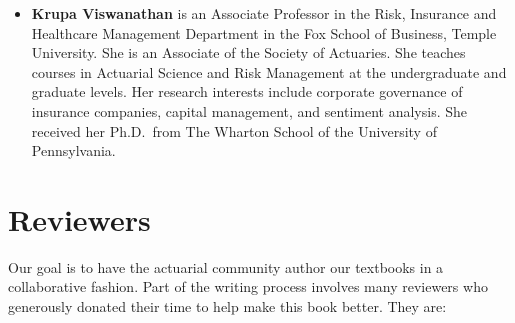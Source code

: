 \documentclass[
]{book}
\providecommand{\tightlist}{%
  \setlength{\itemsep}{0pt}\setlength{\parskip}{0pt}}
\begin{document}
\begin{itemize}
\tightlist
\item
  \textbf{Krupa Viswanathan} is an Associate Professor in the Risk, Insurance and Healthcare Management Department in the Fox School of Business, Temple University. She is an Associate of the Society of Actuaries. She teaches courses in Actuarial Science and Risk Management at the undergraduate and graduate levels. Her research interests include corporate governance of insurance companies, capital management, and sentiment analysis. She received her Ph.D.~from The Wharton School of the University of Pennsylvania.
\end{itemize}

\hypertarget{reviewers}{%
\section*{Reviewers}\label{reviewers}}

Our goal is to have the actuarial community author our textbooks in a collaborative fashion. Part of the writing process involves many reviewers who generously donated their time to help make this book better. They are:
\end{document}
